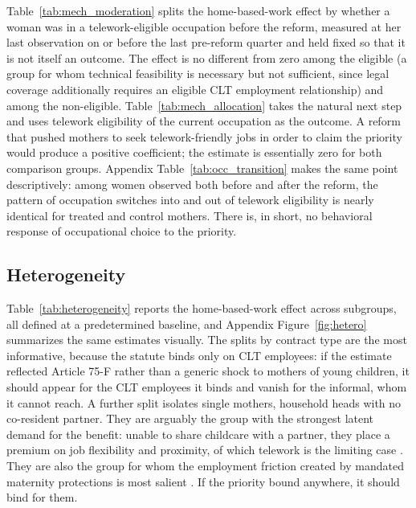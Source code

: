 \documentclass[12pt]{article}
\begin{document}
Table~\ref{tab:mech_moderation} splits the home-based-work effect by whether a woman was in a telework-eligible occupation before the reform, measured at her last observation on or before the last pre-reform quarter and held fixed so that it is not itself an outcome. The effect is no different from zero among the eligible (a group for whom technical feasibility is necessary but not sufficient, since legal coverage additionally requires an eligible CLT employment relationship) and among the non-eligible. Table~\ref{tab:mech_allocation} takes the natural next step and uses telework eligibility of the current occupation as the outcome. A reform that pushed mothers to seek telework-friendly jobs in order to claim the priority would produce a positive coefficient; the estimate is essentially zero for both comparison groups. Appendix Table~\ref{tab:occ_transition} makes the same point descriptively: among women observed both before and after the reform, the pattern of occupation switches into and out of telework eligibility is nearly identical for treated and control mothers. There is, in short, no behavioral response of occupational choice to the priority.




\subsection{Heterogeneity}\label{sec:heterogeneity}

Table~\ref{tab:heterogeneity} reports the home-based-work effect across subgroups, all defined at a predetermined baseline, and Appendix Figure~\ref{fig:hetero} summarizes the same estimates visually. The splits by contract type are the most informative, because the statute binds only on CLT employees: if the estimate reflected Article 75-F rather than a generic shock to mothers of young children, it should appear for the CLT employees it binds and vanish for the informal, whom it cannot reach. A further split isolates single mothers, household heads with no co-resident partner. They are arguably the group with the strongest latent demand for the benefit: unable to share childcare with a partner, they place a premium on job flexibility and proximity, of which telework is the limiting case \citep{berniell2023,maspallais2017,lebarbanchon2021}. They are also the group for whom the employment friction created by mandated maternity protections is most salient \citep{gruber1994}. If the priority bound anywhere, it should bind for them.
\end{document}
